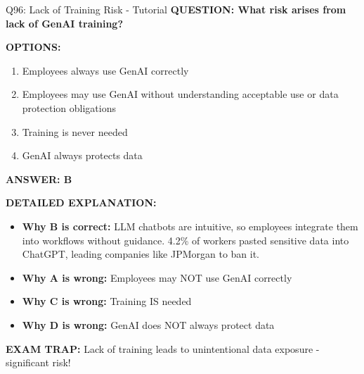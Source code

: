 \documentclass[8pt]{beamer}
\begin{document}
	\begin{frame}{Q96: Lack of Training Risk - Tutorial}
		\fontsize{6.5}{7.5}\selectfont
		\textbf{QUESTION: What risk arises from lack of GenAI training?}
		
		\vspace{0.1cm}
		\textbf{OPTIONS:}
		\begin{enumerate}
			\item Employees always use GenAI correctly
			\item Employees may use GenAI without understanding acceptable use or data protection obligations
			\item Training is never needed
			\item GenAI always protects data
		\end{enumerate}
		
		\vspace{0.1cm}
		\textcolor{myblue}{\textbf{ANSWER: B}}
		
		\vspace{0.1cm}
		\textbf{DETAILED EXPLANATION:}
		\begin{itemize}
			\item \textbf{Why B is correct:} LLM chatbots are intuitive, so employees integrate them into workflows without guidance. 4.2\% of workers pasted sensitive data into ChatGPT, leading companies like JPMorgan to ban it.
			\item \textbf{Why A is wrong:} Employees may NOT use GenAI correctly
			\item \textbf{Why C is wrong:} Training IS needed
			\item \textbf{Why D is wrong:} GenAI does NOT always protect data
		\end{itemize}
		
		\textcolor{myred}{\textbf{EXAM TRAP:}} Lack of training leads to \textcolor{myblue}{unintentional data exposure} - significant risk!
	\end{frame}
	
\end{document}
